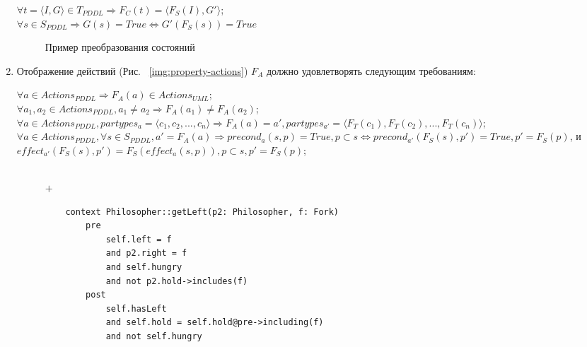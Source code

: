\begin{enumerate}
        \begin{center}
            $\forall t = \langle I, G \rangle \in T_{PDDL} \Rightarrow F_C(t) = \langle F_S(I), G' \rangle$; \\
            $\forall s \in S_{PDDL} \Rightarrow G(s) = True \Leftrightarrow G'(F_S(s)) = True $
        \end{center}
   
\begin{figure}[h]
    \caption{Пример преобразования состояний}
    \label{img:property-tasks}
\end{figure}   
           
        \item
    Отображение действий (Рис.
~\ref{img:property-actions}) $F_A$ должно удовлетворять следующим требованиям:
    \begin{center}
        $\forall a \in Actions_{PDDL} \Rightarrow F_A(a) \in Actions_{UML}$; \\    
    
        $\forall a_1, a_2 \in Actions_{PDDL}, a_1 \neq a_2 \Rightarrow F_A(a_1) \neq F_A(a_2)$; \\        
 
        $\forall a \in Actions_{PDDL}, partypes_a = \langle c_1, c_2, ..., c_n \rangle \Rightarrow F_A(a) = a', partypes_{a'} = \langle F_T(c_1), F_T(c_2), ..., F_T(c_n)\rangle$; \\
 
        $\forall a \in Actions_{PDDL}, \forall s \in S_{PDDL}, a' = F_A(a) \Rightarrow precond_a(s, p) = True, p \subset s \Leftrightarrow precond_{a'}(F_S(s), p') = True, p' = F_S(p)$, и \\
        
        $effect_{a'}(F_S(s), p') = F_S(effect_a(s, p)), p \subset s, p' = F_S(p) $;
    \end{center}            
       
\begin{figure}[h]
    \begin{minipage}[h]{1\linewidth}
    \end{minipage} \\
    \vfill
    {\centering $+$ \\ \medskip } 
        \begin{minipage}[h]{0.43\linewidth}
        
           \begin{verbatim}
    context Philosopher::getLeft(p2: Philosopher, f: Fork)
        pre 
            self.left = f 
            and p2.right = f 
            and self.hungry 
            and not p2.hold->includes(f)
        post
            self.hasLeft
            and self.hold = self.hold@pre->including(f)
            and not self.hungry
           \end{verbatim}
        \end{minipage}


\end{figure}
\end{enumerate}

